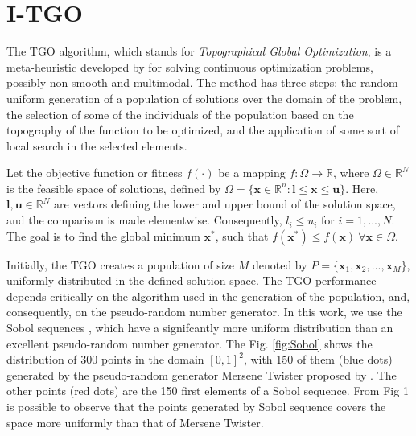 \section{I-TGO}

The TGO algorithm, which stands for \textit{Topographical Global Optimization}, is a meta-heuristic developed by \cite{ITGO1} for solving continuous optimization problems, possibly non-smooth and multimodal. The method has three steps: the random uniform generation of a population of solutions over the domain of the problem, the selection of some of the individuals of the population based on the topography of the function to be optimized, and the application of some sort of local search in the selected elements.

Let the objective function or fitness $f(\cdot)$ be a mapping $f : \Omega \rightarrow \mathbb{R}$, where $\Omega \in \mathbb{R}^N$ is the feasible space of solutions, defined by $\Omega = \{\bm{x} \in \mathbb{R}^n : \bm{l} \leq \bm{x} \leq \bm{u}\}$. Here, $\bm{l}, \bm{u} \in \mathbb{R}^N$ are vectors defining the lower and upper bound of the solution space, and the comparison is made elementwise. Consequently, $l_i \leq u_i $ for $i = 1, ..., N$. The goal is to find the global minimum $\bm{x^*}$, such that $f(\bm{x^*}) \leq f(\bm{x}) \ \forall \bm{x} \in \Omega$.

Initially, the TGO creates a population of size $M$ denoted by $P = \{\bm{x}_1, \bm{x}_2, ..., \allowbreak \bm{x}_M\}$, uniformly distributed in the defined solution space. The TGO performance depends critically on the algorithm used in the generation of the population, and, consequently, on the pseudo-random number generator. In this work, we use the Sobol sequences \cite{Sobol, ITGO3}, which have a signifcantly more uniform distribution than an excellent pseudo-random number generator. The Fig. \ref{fig:Sobol} shows the distribution of 300 points in the domain $[0, 1]^2$, with 150 of them (blue dots) generated by the pseudo-random generator Mersene Twister proposed by \cite{mt19937}. The other points (red dots) are the 150 first elements of a Sobol sequence. From Fig 1 is possible to observe that the points generated by Sobol sequence covers the space more uniformly than that of Mersene Twister.


